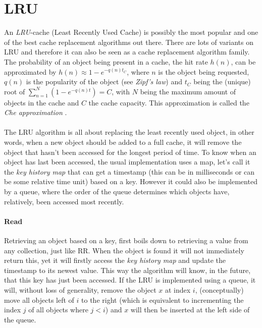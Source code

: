\documentclass[pdftex,a4paper,12pt,twoside]{report}
\begin{document}
\section{LRU}
An \emph{LRU}-cache (Least Recently Used Cache) is possibly the most popular and one of the best cache replacement algorithms out there. There are lots of variants on LRU and therefore it can also be seen as a cache replacement algorithm family. The probability of an object being present in a cache, the hit rate $h(n)$, can be approximated by 
$h(n) \approx 1 - e^{-q(n)t_C}$, where $n$ is the object being requested, $q(n)$ is the popularity of the object (see \emph{Zipf's law}) and $t_C$ being the (unique) root of 
$\sum_{n=1}^N(1-e^{-q(n)t})=C$, with $N$ being the maximum amount of objects in the cache and $C$ the cache capacity. This approximation is called the \emph{Che approximation} \citep{fricker2012versatile}.
\\\\
The LRU algorithm is all about replacing the least recently used object, in other words, when a new object should be added to a full cache, it will remove the object that hasn't been accessed for the longest period of time. To know when an object has last been accessed, the usual implementation uses a map, let's call it the \emph{key history map} that can get a timestamp (this can be in milliseconds or can be some relative time unit) based on a key. However it could also be implemented by a queue, where the order of the queue determines which objects have, relatively, been accessed most recently.
\paragraph{Read} Retrieving an object based on a key, first boils down to retrieving a value from any collection, just like RR. When the object is found it will not immediately return this, yet it will firstly access the \emph{key history map} and update the timestamp to its newest value. This way the algorithm will know, in the future, that this key has just been accessed. If the LRU is implemented using a queue, it will, without loss of generality, remove the object $x$ at index $i$, (conceptually) move all objects left of $i$ to the right (which is equivalent to incrementing the index $j$ of all objects where $j < i$) and $x$ will then be inserted at the left side of the queue.
\end{document}
